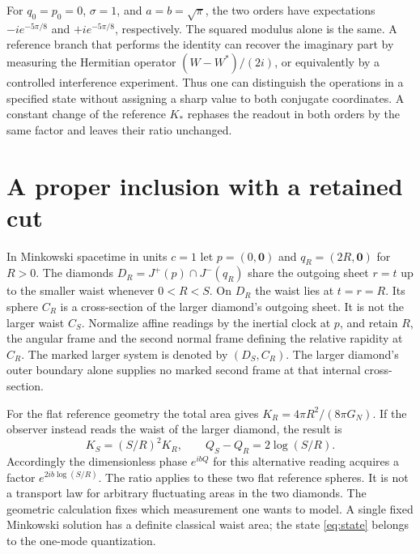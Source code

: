 \documentclass[11pt,letterpaper]{article}
\begin{document}
For $q_0=p_0=0$, $\sigma=1$, and $a=b=\sqrt{\pi}$, the two orders have expectations $-i e^{-5\pi/8}$ and $+i e^{-5\pi/8}$, respectively. The squared modulus alone is the same. A reference branch that performs the identity can recover the imaginary part by measuring the Hermitian operator $(W-W^*)/(2i)$, or equivalently by a controlled interference experiment. Thus one can distinguish the operations in a specified state without assigning a sharp value to both conjugate coordinates. A constant change of the reference $K_*$ rephases the readout in both orders by the same factor and leaves their ratio unchanged.

\section{A proper inclusion with a retained cut}

In Minkowski spacetime in units $c=1$ let $p=(0,\mathbf 0)$ and $q_R=(2R,\mathbf 0)$ for $R>0$. The diamonds $D_R=J^+(p)\cap J^-(q_R)$ share the outgoing sheet $r=t$ up to the smaller waist whenever $0<R<S$. On $D_R$ the waist lies at $t=r=R$. Its sphere $C_R$ is a cross-section of the larger diamond's outgoing sheet. It is not the larger waist $C_S$. Normalize affine readings by the inertial clock at $p$, and retain $R$, the angular frame and the second normal frame defining the relative rapidity at $C_R$. The marked larger system is denoted by $(D_S,C_R)$. The larger diamond's outer boundary alone supplies no marked second frame at that internal cross-section.

For the flat reference geometry the total area gives $K_R=4\pi R^2/(8\pi G_N)$. If the observer instead reads the waist of the larger diamond, the result is
\[
 K_S=(S/R)^2K_R,\qquad
 Q_S-Q_R=2\log(S/R).
\]
Accordingly the dimensionless phase $e^{ibQ}$ for this alternative reading acquires a factor $e^{2ib\log(S/R)}$. The ratio applies to these two flat reference spheres. It is not a transport law for arbitrary fluctuating areas in the two diamonds. The geometric calculation fixes which measurement one wants to model. A single fixed Minkowski solution has a definite classical waist area; the state \eqref{eq:state} belongs to the one-mode quantization.
\end{document}
